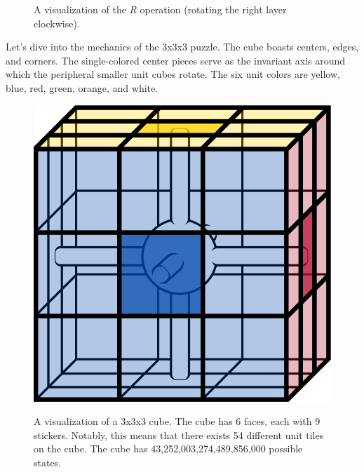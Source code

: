 \documentclass[12pt]{article}
\begin{document}
\begin{figure}[h]
\begin{minipage}[c]{0.2\textwidth}
    \end{minipage}
    \caption{A visualization of the \textit{R} operation (rotating the right layer clockwise).}
\end{figure}

Let's dive into the mechanics of the 3x3x3 puzzle. The cube boasts centers, edges, and corners. The single-colored center pieces serve as the invariant axis around which the peripheral smaller unit cubes rotate. The six unit colors are yellow, blue, red, green, orange, and white.

\begin{figure}[h]
    \hfill 
    \begin{minipage}[c]{0.2\textwidth} 
        \centering
        \includegraphics[scale=0.1]{moves/core.png}
    \end{minipage}
    \hfill 
    \begin{minipage}[c]{0.59\textwidth} 
        \vspace*{\fill} 
        A visualization of a 3x3x3 cube. The cube has 6 faces, each with 9 stickers. Notably, this means that there exists 54 different unit tiles on the cube. The cube has 43,252,003,274,489,856,000 possible states.\footnotemark
        \vspace*{\fill}
    \end{minipage}
    \hfill 
\end{figure}
\end{document}
